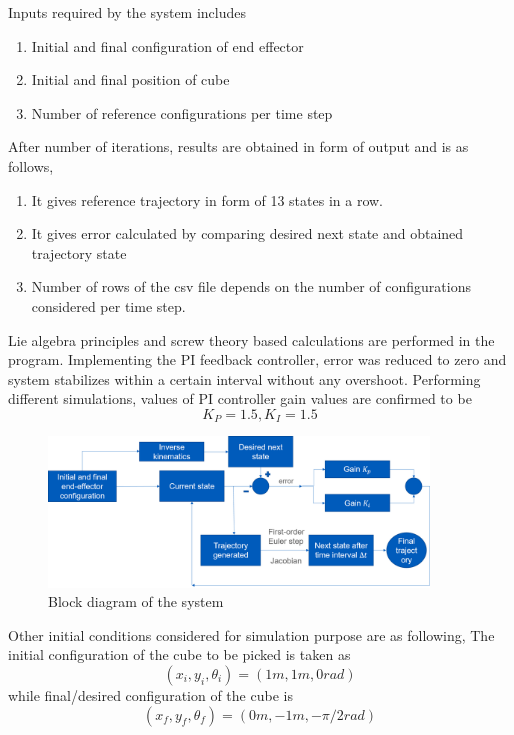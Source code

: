 \documentclass[12pt]{article}
\begin{document}
Inputs required by the system includes
\begin{enumerate}
    \item Initial and final configuration of end effector
\item Initial and final position of cube
\item Number of reference configurations per time step
\end{enumerate}

After number of iterations, results are  obtained in form of output and is as follows,
\begin{enumerate}
    \item It gives reference trajectory in form of 13 states in a row. 
\item It gives error calculated by comparing desired next state and obtained trajectory state 
\item Number of rows of the csv file depends on the number of configurations considered per time step.
\end{enumerate}

Lie algebra principles and screw theory based calculations are performed in the program. Implementing the PI feedback controller, error was reduced to zero and system stabilizes within a certain interval without any overshoot. Performing different simulations, values of PI controller gain values are confirmed to be 
\begin{equation}
    K_P = 1.5,  K_I = 1.5 
\end{equation}   

\begin{figure}[H]
\centering
\includegraphics[width=0.9\textwidth]{Picture2.png}
\captionsetup{labelformat=empty}
\caption{Block diagram of the system}
\end{figure}

Other  initial conditions considered for simulation purpose are as following,
The initial configuration of the cube to be picked is taken as
\begin{equation}
    (x_i, y_i, \theta_i) = (1 m, 1 m, 0 rad)
\end{equation}
   while final/desired configuration of the cube is 
\begin{equation}
    (x_f, y_f, \theta_f) = (0 m, -1 m, -\pi/2 rad)
\end{equation}
 
\end{document}
